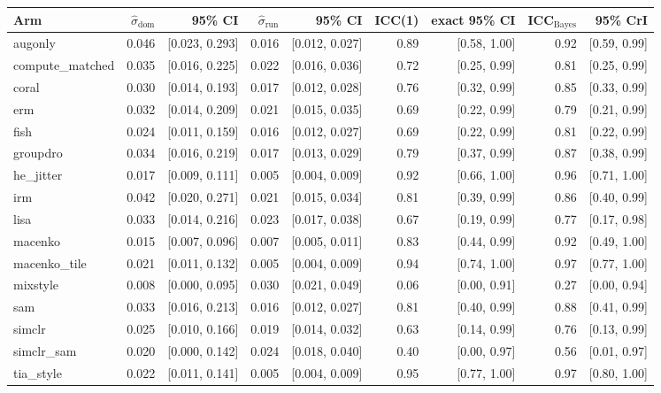 \begin{tabular}{lrrrrrrrr}
\toprule
Arm & $\hat\sigma_\text{dom}$ & 95\% CI & $\hat\sigma_\text{run}$ & 95\% CI & ICC(1) & exact 95\% CI & ICC$_\text{Bayes}$ & 95\% CrI \\
\midrule
augonly & 0.046 & [0.023, 0.293] & 0.016 & [0.012, 0.027] & 0.89 & [0.58, 1.00] & 0.92 & [0.59, 0.99] \\
compute\_matched & 0.035 & [0.016, 0.225] & 0.022 & [0.016, 0.036] & 0.72 & [0.25, 0.99] & 0.81 & [0.25, 0.99] \\
coral & 0.030 & [0.014, 0.193] & 0.017 & [0.012, 0.028] & 0.76 & [0.32, 0.99] & 0.85 & [0.33, 0.99] \\
erm & 0.032 & [0.014, 0.209] & 0.021 & [0.015, 0.035] & 0.69 & [0.22, 0.99] & 0.79 & [0.21, 0.99] \\
fish & 0.024 & [0.011, 0.159] & 0.016 & [0.012, 0.027] & 0.69 & [0.22, 0.99] & 0.81 & [0.22, 0.99] \\
groupdro & 0.034 & [0.016, 0.219] & 0.017 & [0.013, 0.029] & 0.79 & [0.37, 0.99] & 0.87 & [0.38, 0.99] \\
he\_jitter & 0.017 & [0.009, 0.111] & 0.005 & [0.004, 0.009] & 0.92 & [0.66, 1.00] & 0.96 & [0.71, 1.00] \\
irm & 0.042 & [0.020, 0.271] & 0.021 & [0.015, 0.034] & 0.81 & [0.39, 0.99] & 0.86 & [0.40, 0.99] \\
lisa & 0.033 & [0.014, 0.216] & 0.023 & [0.017, 0.038] & 0.67 & [0.19, 0.99] & 0.77 & [0.17, 0.98] \\
macenko & 0.015 & [0.007, 0.096] & 0.007 & [0.005, 0.011] & 0.83 & [0.44, 0.99] & 0.92 & [0.49, 1.00] \\
macenko\_tile & 0.021 & [0.011, 0.132] & 0.005 & [0.004, 0.009] & 0.94 & [0.74, 1.00] & 0.97 & [0.77, 1.00] \\
mixstyle & 0.008 & [0.000, 0.095] & 0.030 & [0.021, 0.049] & 0.06 & [0.00, 0.91] & 0.27 & [0.00, 0.94] \\
sam & 0.033 & [0.016, 0.213] & 0.016 & [0.012, 0.027] & 0.81 & [0.40, 0.99] & 0.88 & [0.41, 0.99] \\
simclr & 0.025 & [0.010, 0.166] & 0.019 & [0.014, 0.032] & 0.63 & [0.14, 0.99] & 0.76 & [0.13, 0.99] \\
simclr\_sam & 0.020 & [0.000, 0.142] & 0.024 & [0.018, 0.040] & 0.40 & [0.00, 0.97] & 0.56 & [0.01, 0.97] \\
tia\_style & 0.022 & [0.011, 0.141] & 0.005 & [0.004, 0.009] & 0.95 & [0.77, 1.00] & 0.97 & [0.80, 1.00] \\
\bottomrule
\end{tabular}
